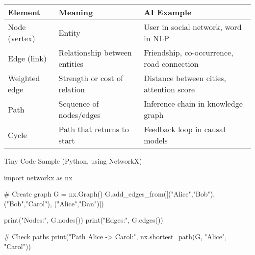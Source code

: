 \documentclass[
  letterpaper,
  DIV=11,
  numbers=noendperiod]{scrreprt}
\newenvironment{Shaded}{\begin{snugshade}}{\end{snugshade}}
\newcommand{\BuiltInTok}[1]{\textcolor[rgb]{0.00,0.23,0.31}{#1}}
\newcommand{\CommentTok}[1]{\textcolor[rgb]{0.37,0.37,0.37}{#1}}
\newcommand{\ImportTok}[1]{\textcolor[rgb]{0.00,0.46,0.62}{#1}}
\newcommand{\NormalTok}[1]{\textcolor[rgb]{0.00,0.23,0.31}{#1}}
\newcommand{\OperatorTok}[1]{\textcolor[rgb]{0.37,0.37,0.37}{#1}}
\newcommand{\StringTok}[1]{\textcolor[rgb]{0.13,0.47,0.30}{#1}}
\begin{document}
\begin{longtable}[]{@{}
  >{\raggedright\arraybackslash}p{}
  >{\raggedright\arraybackslash}p{}
  >{\raggedright\arraybackslash}p{}@{}}
\toprule\noalign{}
\begin{minipage}[b]{\linewidth}\raggedright
Element
\end{minipage} & \begin{minipage}[b]{\linewidth}\raggedright
Meaning
\end{minipage} & \begin{minipage}[b]{\linewidth}\raggedright
AI Example
\end{minipage} \\
\midrule\noalign{}
\endhead
\bottomrule\noalign{}
\endlastfoot
Node (vertex) & Entity & User in social network, word in NLP \\
Edge (link) & Relationship between entities & Friendship, co-occurrence,
road connection \\
Weighted edge & Strength or cost of relation & Distance between cities,
attention score \\
Path & Sequence of nodes/edges & Inference chain in knowledge graph \\
Cycle & Path that returns to start & Feedback loop in causal models \\
\end{longtable}

Tiny Code Sample (Python, using NetworkX)

\begin{Shaded}
\begin{Highlighting}[]
\ImportTok{import}\NormalTok{ networkx }\ImportTok{as}\NormalTok{ nx}

\CommentTok{\# Create graph}
\NormalTok{G }\OperatorTok{=}\NormalTok{ nx.Graph()}
\NormalTok{G.add\_edges\_from([(}\StringTok{"Alice"}\NormalTok{,}\StringTok{"Bob"}\NormalTok{), (}\StringTok{"Bob"}\NormalTok{,}\StringTok{"Carol"}\NormalTok{), (}\StringTok{"Alice"}\NormalTok{,}\StringTok{"Dan"}\NormalTok{)])}

\BuiltInTok{print}\NormalTok{(}\StringTok{"Nodes:"}\NormalTok{, G.nodes())}
\BuiltInTok{print}\NormalTok{(}\StringTok{"Edges:"}\NormalTok{, G.edges())}

\CommentTok{\# Check paths}
\BuiltInTok{print}\NormalTok{(}\StringTok{"Path Alice {-}\textgreater{} Carol:"}\NormalTok{, nx.shortest\_path(G, }\StringTok{"Alice"}\NormalTok{, }\StringTok{"Carol"}\NormalTok{))}
\end{Highlighting}
\end{Shaded}
\end{document}
